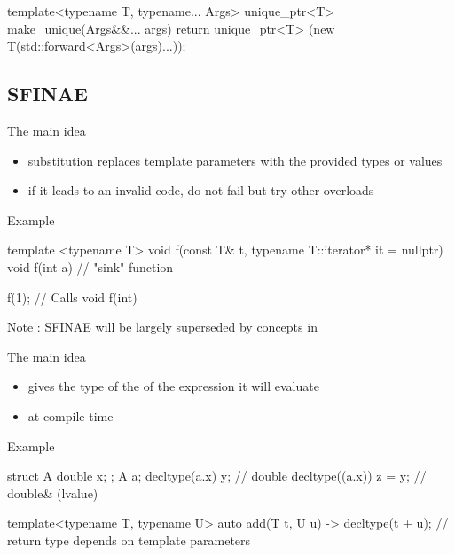 \begin{frame}[fragile]
  \begin{cppcode*}{}
    template<typename T, typename... Args>
    unique_ptr<T> make_unique(Args&&... args) {
      return unique_ptr<T>
        (new T(std::forward<Args>(args)...));
    }
  \end{cppcode*}  
\end{frame}

\subsection[sfinae]{SFINAE}

\begin{frame}[fragile]
  \begin{block}{The main idea}
    \begin{itemize}
    \item substitution replaces template parameters with the provided types or values
    \item if it leads to an invalid code, do not fail but try other overloads
    \end{itemize}
  \end{block}
  \begin{exampleblock}{Example}
    \begin{cppcode*}{}
      template <typename T>
      void f(const T& t,
             typename T::iterator* it = nullptr) { }
      void f(int a) { }   // "sink" function

      f(1); // Calls void f(int)
    \end{cppcode*}
  \end{exampleblock}
  Note : SFINAE will be largely superseded by concepts in 
\end{frame}

\begin{frame}[fragile]
  \begin{block}{The main idea}
    \begin{itemize}
    \item gives the type of the of the expression it will evaluate
    \item at compile time
    \end{itemize}
  \end{block}
  \begin{exampleblock}{Example}
    \begin{cppcode*}{}
      struct A { double x; };
      A a;
      decltype(a.x) y;       // double
      decltype((a.x)) z = y; // double& (lvalue)
 
      template<typename T, typename U>
      auto add(T t, U u) -> decltype(t + u);
      // return type depends on template parameters
    \end{cppcode*}
  \end{exampleblock}  
\end{frame}

